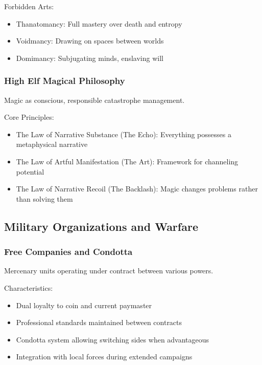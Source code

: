 Forbidden Arts:
\begin{itemize}
    \item Thanatomancy: Full mastery over death and entropy
    \item Voidmancy: Drawing on spaces between worlds
    \item Domimancy: Subjugating minds, enslaving will
\end{itemize}

\subsubsection{High Elf Magical Philosophy}
\label{sec:highelfmagic}

Magic as conscious, responsible catastrophe management.

Core Principles:
\begin{itemize}
    \item The Law of Narrative Substance (The Echo): Everything possesses a metaphysical narrative
    \item The Law of Artful Manifestation (The Art): Framework for channeling potential
    \item The Law of Narrative Recoil (The Backlash): Magic changes problems rather than solving them
\end{itemize}

\subsection{Military Organizations and Warfare}

\subsubsection{Free Companies and Condotta}
\label{sec:freecompanies}

Mercenary units operating under contract between various powers.

Characteristics:
\begin{itemize}
    \item Dual loyalty to coin and current paymaster
    \item Professional standards maintained between contracts
    \item Condotta system allowing switching sides when advantageous
    \item Integration with local forces during extended campaigns
\end{itemize}

